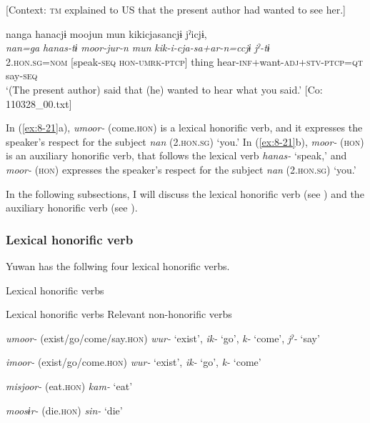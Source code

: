     [Context: \textsc{tm} explained to US that the present author had wanted to see her.]

{\TM}
\glll  nanga  hanacjɨ  moojun  mun    kikicjasancjɨ  jˀicjɨ,\\
\textit{nan=ga}  \textit{hanas-tɨ}  \textit{moor-jur-n  mun} \textit{kik-i-cja-sa+ar-n=ccjɨ}  \textit{jˀ-tɨ}\\
2.\textsc{hon}.\textsc{sg}=\textsc{nom}  [speak-\textsc{seq}  \textsc{hon}-\textsc{umrk}-\textsc{ptcp}]  thing   hear-\textsc{inf}+want-\textsc{adj}+\textsc{stv}-\textsc{ptcp}=\textsc{qt}  say-\textsc{seq}\\
\glt ‘(The present author) said that (he) wanted to hear what you said.’ [Co: 110328\_00.txt]
\z
\z

In (\ref{ex:8-21}a), \textit{umoor-} (come.\textsc{hon}) is a lexical honorific verb, and it expresses the speaker’s respect for the subject \textit{nan} (2.\textsc{hon}.\textsc{sg}) ‘you.’ In (\ref{ex:8-21}b), \textit{moor-} (\textsc{hon}) is an auxiliary honorific verb, that follows the lexical verb \textit{hanas-} ‘speak,’ and \textit{moor-} (\textsc{hon}) expresses the speaker’s respect for the subject \textit{nan} (2.\textsc{hon}.\textsc{sg}) ‘you.’

  In the following subsections, I will discuss the lexical honorific verb (see ) and the auxiliary honorific verb (see ).

\subsubsection{Lexical honorific verb}

Yuwan has the follwing four lexical honorific verbs.

\begin{table}
\caption{\label{tab:key:72}Lexical honorific verbs}

Lexical honorific verbs  Relevant non-honorific verbs

\textit{umoor-} (exist/go/come/say.\textsc{hon})  \textit{wur-} ‘exist’, \textit{ik-} ‘go’, \textit{k-} ‘come’, \textit{jˀ-} ‘say’

\textit{imoor-} (exist/go/come.\textsc{hon})  \textit{wur-} ‘exist’, \textit{ik-} ‘go’, \textit{k-} ‘come’

\textit{misjoor-} (eat.\textsc{hon})  \textit{kam-} ‘eat’

\textit{moosɨr-} (die.\textsc{hon})  \textit{sin-} ‘die’
\end{table}

